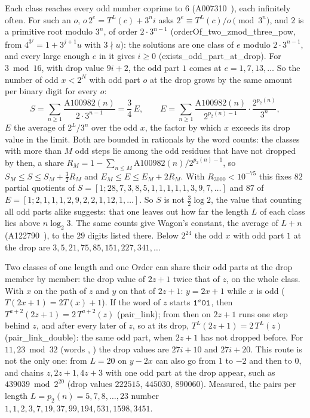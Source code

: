 \documentclass[10pt,a4paper,titlepage]{article}
\newcommand{\lean}[1]{\textsf{#1}}
\begin{document}
Each class reaches every odd number coprime to $6$
(A007310~\cite{OEIS_A007310}), each infinitely often. For such an $o$,
$o\,2^e = T^L(c) + 3^n i$ asks $2^e \equiv T^L(c)/o \pmod{3^n}$, and $2$ is a primitive root
modulo $3^n$, of order $2 \cdot 3^{n-1}$ (\lean{orderOf\_two\_zmod\_three\_pow}, from
$4^{3^j} = 1 + 3^{j+1}u$ with $3 \nmid u$): the solutions are one class of $e$ modulo
$2 \cdot 3^{n-1}$, and every large enough $e$ in it gives $i \ge 0$
(\lean{exists\_odd\_part\_at\_drop}). For $3 \bmod 16$, with drop
value $9i + 2$, the odd part $1$ comes at $e = 1, 7, 13, \ldots$ So the number of odd $x < 2^N$
with odd part $o$ at the drop grows by the same amount per binary digit for every $o$:
\[
S = \sum_{n \ge 1} \frac{\mathrm{A100982}(n)}{2 \cdot 3^{n-1}} = \frac{3}{4}\,E , \qquad
E = \sum_{n \ge 1} \frac{\mathrm{A100982}(n)}{2^{p_2(n)-1}} \cdot \frac{2^{p_2(n)}}{3^n} ,
\]
$E$ the average of $2^L/3^n$ over the odd $x$, the factor by which $x$ exceeds its drop value
in the limit. Both are bounded in rationals by the word counts: the classes with more than
$M$ odd steps lie among the odd residues that have not dropped by then, a share
$R_M = 1 - \sum_{n \le M} \mathrm{A100982}(n)/2^{p_2(n)-1}$, so $S_M \le S \le S_M + \tfrac{3}{2}R_M$
and $E_M \le E \le E_M + 2R_M$. With $R_{3000} < 10^{-75}$ this fixes $82$ partial quotients of
$S = [1; 28, 7, 3, 8, 5, 1, 1, 1, 1, 1, 3, 9, 7, \ldots]$ and $87$ of
$E = [1; 2, 1, 1, 1, 2, 9, 2, 2, 1, 12, 1, \ldots]$. So $S$ is not
$\tfrac{3}{2}\log 2$, the value that counting all odd parts alike suggests: that one leaves out
how far the length $L$ of each class lies above $n \log_2 3$. The same counts give Wagon's constant, the average of $L + n$
(A122790~\cite{OEIS_A122790}), to the $29$ digits listed there. Below
$2^{24}$ the odd $x$ with odd part $1$ at the drop are $3, 5, 21, 75, 85, 151, 227, 341, \ldots$

Two classes of one length and one Order can share their odd parts at the drop member by
member: the drop value of $2z + 1$ twice that of $z$, on the whole class. With $x$ on the path of $z$ and $y$ on
that of $2z + 1$: $y = 2x + 1$ while $x$ is odd ($T(2x + 1) = 2T(x) + 1$). If the word of $z$
starts $\text{\texttt{1}}^a\text{\texttt{01}}$, then $T^{a+2}(2z + 1) = 2\,T^{a+2}(z)$ (\lean{pair\_link}); from then
on $2z + 1$ runs one step behind $z$, and after every later  of $z$, so at its drop,
$T^L(2z + 1) = 2\,T^L(z)$ (\lean{pair\_link\_double}): the same odd part, when $2z + 1$ has
not dropped before. For $11, 23 \bmod 32$ (words , ) the drop values are
$27i + 10$ and $27i + 20$. This route is not the only one: from $L = 20$ on $y - 2x$ can also
go from $1$ to $-2$ and then to $0$, and chains $z, 2z + 1, 4z + 3$ with one odd part at the drop
appear, such as $439039 \bmod 2^{20}$ (drop values $222515$, $445030$, $890060$). Measured,
the pairs per length $L = p_2(n) = 5, 7, 8, \ldots, 23$ number $1, 1, 2, 3, 7, 19, 37, 99, 194, 531, 1598, 3451$.
\end{document}
